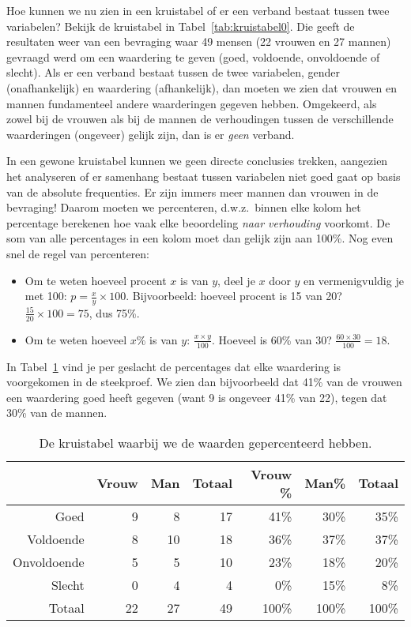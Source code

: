 Hoe kunnen we nu zien in een kruistabel of er een verband bestaat tussen twee variabelen? Bekijk de kruistabel in Tabel~\ref{tab:kruistabel0}. Die geeft de resultaten weer van een bevraging waar 49 mensen (22 vrouwen en 27 mannen) gevraagd werd om een waardering te geven (goed, voldoende, onvoldoende of slecht). Als er een verband bestaat tussen de twee variabelen, gender (onafhankelijk) en waardering (afhankelijk), dan moeten we zien dat vrouwen en mannen fundamenteel andere waarderingen gegeven hebben. Omgekeerd, als zowel bij de vrouwen als bij de mannen de verhoudingen tussen de verschillende waarderingen (ongeveer) gelijk zijn, dan is er \emph{geen} verband.

In een gewone kruistabel kunnen we geen directe conclusies trekken, aangezien het analyseren of er samenhang bestaat tussen variabelen niet goed gaat op basis van de absolute frequenties. Er zijn immers meer mannen dan vrouwen in de bevraging! Daarom moeten we percenteren, d.w.z.~binnen elke kolom het percentage berekenen hoe vaak elke beoordeling \emph{naar verhouding} voorkomt. De som van alle percentages in een kolom moet dan gelijk zijn aan 100\%. Nog even snel de regel van percenteren:

\begin{itemize}
  \item Om te weten hoeveel procent $x$ is van $y$, deel je $x$ door $y$ en vermenigvuldig je met 100: $p = \frac{x}{y} \times 100$. Bijvoorbeeld: hoeveel procent is 15 van 20? $\frac{15}{20} \times 100 = 75$, dus 75\%.
  \item Om te weten hoeveel $x\%$ is van $y$: $\frac{x \times y}{100}$. Hoeveel is 60\% van 30? $\frac{60 \times 30}{100} = 18$.
\end{itemize}

In Tabel~\ref{tab:kruistabel1} vind je per geslacht de percentages dat elke waardering is voorgekomen in de steekproef. We zien dan bijvoorbeeld dat 41\% van de vrouwen een waardering goed heeft gegeven (want 9 is ongeveer 41\% van 22), tegen dat 30\% van de mannen.

\begin{table} \centering
  \begin{tabular}{@{}rrrrrrr@{}}
  	\toprule
  	            & Vrouw & Man & Totaal & Vrouw \% & Man\% & Totaal \\
  	\midrule
  	       Goed &     9 &   8 &     17 &     41\% &  30\% &   35\% \\
  	  Voldoende &     8 &  10 &     18 &     36\% &  37\% &   37\% \\
  	Onvoldoende &     5 &   5 &     10 &     23\% &  18\% &   20\% \\
  	     Slecht &     0 &   4 &      4 &      0\% &  15\% &    8\% \\
  	     Totaal &    22 &  27 &     49 &    100\% & 100\% &  100\% \\
  	\bottomrule
  \end{tabular}
  \caption{De kruistabel waarbij we de waarden gepercenteerd hebben.}
  \label{tab:kruistabel1}
\end{table}

